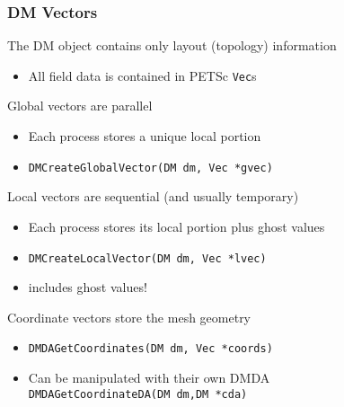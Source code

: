 \begin{frame}[fragile]
 
\frametitle{DM Vectors}

\begin{block}{The DM object contains only layout (topology) information}
  \begin{itemize}
    \item All field data is contained in PETSc \lstinline|Vec|s
  \end{itemize}
\end{block}

\begin{block}{Global vectors are parallel}
  \begin{itemize}
    \item Each process stores a unique local portion
    \item \lstinline|DMCreateGlobalVector(DM dm, Vec *gvec)|
  \end{itemize}
\end{block}

\begin{block}{Local vectors are sequential (and usually temporary)}
  \begin{itemize}
    \item Each process stores its local portion plus ghost values
    \item \lstinline|DMCreateLocalVector(DM dm, Vec *lvec)|
    \item includes ghost values!
  \end{itemize}
\end{block}

\begin{block}{Coordinate vectors store the mesh geometry}
    \begin{itemize}
    \item \lstinline|DMDAGetCoordinates(DM dm, Vec *coords)|
    \item Can be manipulated with their own DMDA \\
      \lstinline|DMDAGetCoordinateDA(DM dm,DM *cda)|
    \end{itemize}
\end{block}

\end{frame}
